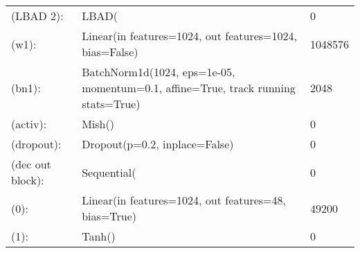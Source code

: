 \begin{center}
\begin{tabular}{ p{}| p{}| p{}}
        (LBAD 2):            & LBAD(                                                                             & 0                   \\
        (w1):                & Linear(in features=1024, out features=1024, bias=False)                           & 1048576             \\
        (bn1):               & BatchNorm1d(1024, eps=1e-05, momentum=0.1, affine=True, track running stats=True) & 2048                \\
        (activ):             & Mish()                                                                            & 0                   \\
        (dropout):           & Dropout(p=0.2, inplace=False)                                                     & 0                   \\

        (dec out block):     & Sequential(                                                                       & 0                   \\
        (0):                 & Linear(in features=1024, out features=48, bias=True)                              & 49200               \\
        (1):                 & Tanh()                                                                            & 0                   \\
    \end{tabular}
\end{center}





